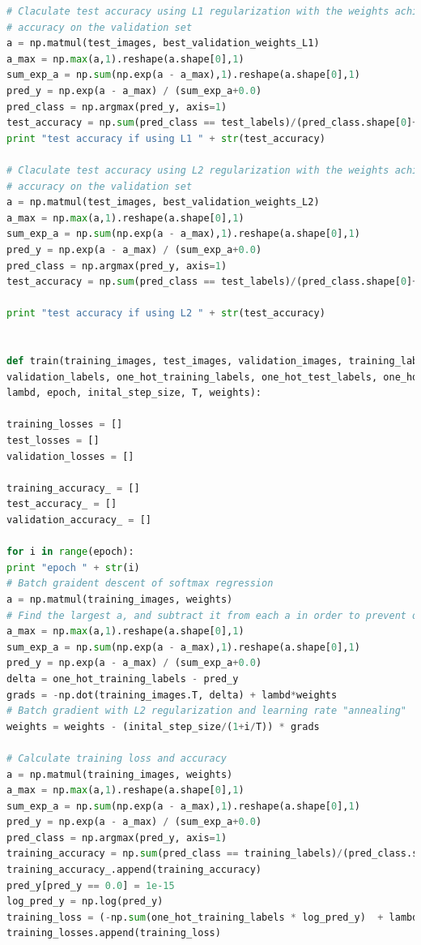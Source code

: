 \documentclass{article} %
\begin{document}
{\begin{lstlisting}[language=Python]
# Claculate test accuracy using L1 regularization with the weights achieve highest 
# accuracy on the validation set
a = np.matmul(test_images, best_validation_weights_L1) 
a_max = np.max(a,1).reshape(a.shape[0],1)
sum_exp_a = np.sum(np.exp(a - a_max),1).reshape(a.shape[0],1)
pred_y = np.exp(a - a_max) / (sum_exp_a+0.0) 
pred_class = np.argmax(pred_y, axis=1)
test_accuracy = np.sum(pred_class == test_labels)/(pred_class.shape[0]+0.0)
print "test accuracy if using L1 " + str(test_accuracy) 

# Claculate test accuracy using L2 regularization with the weights achieve highest 
# accuracy on the validation set
a = np.matmul(test_images, best_validation_weights_L2) 
a_max = np.max(a,1).reshape(a.shape[0],1)
sum_exp_a = np.sum(np.exp(a - a_max),1).reshape(a.shape[0],1) 
pred_y = np.exp(a - a_max) / (sum_exp_a+0.0) 
pred_class = np.argmax(pred_y, axis=1)
test_accuracy = np.sum(pred_class == test_labels)/(pred_class.shape[0]+0.0)

print "test accuracy if using L2 " + str(test_accuracy) 


def train(training_images, test_images, validation_images, training_labels, test_labels, \
validation_labels, one_hot_training_labels, one_hot_test_labels, one_hot_validation_labels, \
lambd, epoch, inital_step_size, T, weights):

training_losses = []
test_losses = []
validation_losses = []

training_accuracy_ = []
test_accuracy_ = []
validation_accuracy_ = []

for i in range(epoch):
print "epoch " + str(i)
# Batch graident descent of softmax regression
a = np.matmul(training_images, weights) 
# Find the largest a, and subtract it from each a in order to prevent overflow
a_max = np.max(a,1).reshape(a.shape[0],1)
sum_exp_a = np.sum(np.exp(a - a_max),1).reshape(a.shape[0],1) 
pred_y = np.exp(a - a_max) / (sum_exp_a+0.0) 
delta = one_hot_training_labels - pred_y 
grads = -np.dot(training_images.T, delta) + lambd*weights
# Batch gradient with L2 regularization and learning rate "annealing"
weights = weights - (inital_step_size/(1+i/T)) * grads

# Calculate training loss and accuracy
a = np.matmul(training_images, weights) 
a_max = np.max(a,1).reshape(a.shape[0],1)
sum_exp_a = np.sum(np.exp(a - a_max),1).reshape(a.shape[0],1) 
pred_y = np.exp(a - a_max) / (sum_exp_a+0.0) 
pred_class = np.argmax(pred_y, axis=1)
training_accuracy = np.sum(pred_class == training_labels)/(pred_class.shape[0]+0.0)
training_accuracy_.append(training_accuracy)
pred_y[pred_y == 0.0] = 1e-15
log_pred_y = np.log(pred_y)
training_loss = (-np.sum(one_hot_training_labels * log_pred_y)  + lambd*LA.norm(weights)**2) / training_images.shape[0]
training_losses.append(training_loss)


\end{lstlisting}}
\end{document}
